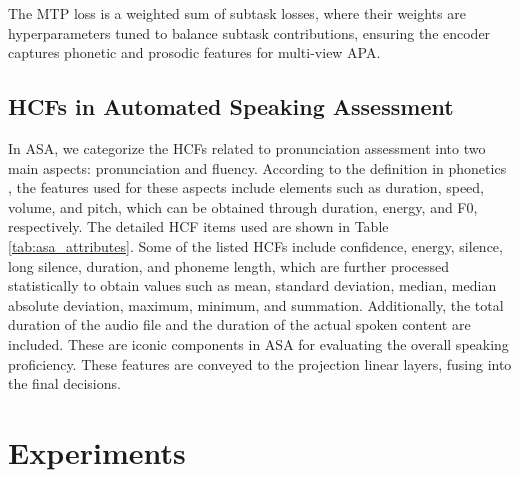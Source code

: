 \documentclass[conference,a4paper]{APSIPA2025}
\begin{document}
The MTP loss is a weighted sum of subtask losses, where their weights are hyperparameters tuned to balance subtask contributions, ensuring the encoder captures phonetic and prosodic features for multi-view APA.

\subsection{HCFs in Automated Speaking Assessment}
\label{sec:handcrafted_features_in_automated_speaking_assessment}

In ASA, we categorize the HCFs related to pronunciation assessment into two main aspects: pronunciation and fluency. According to the definition in phonetics \cite{wayland2018phonetics}, the features used for these aspects include elements such as duration, speed, volume, and pitch, which can be obtained through duration, energy, and F0, respectively. The detailed HCF items used are shown in Table \ref{tab:asa_attributes}. Some of the listed HCFs include confidence, energy, silence, long silence, duration, and phoneme length, which are further processed statistically to obtain values such as mean, standard deviation, median, median absolute deviation, maximum, minimum, and summation. Additionally, the total duration of the audio file and the duration of the actual spoken content are included. These are iconic components in ASA for evaluating the overall speaking proficiency. These features are conveyed to the projection linear layers, fusing into the final decisions.

\section{Experiments}
\label{sec:experiments}
\end{document}
